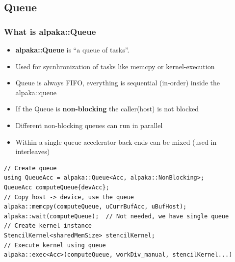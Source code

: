 \documentclass[9pt]{beamer}
\begin{document}
\subsection{Queue}

\begin{frame} [fragile]
\frametitle{What is alpaka::Queue}
\begin{itemize}
 \item \textbf{alpaka::Queue} is “a queue of tasks”.
 \item Used for sycnhronization of tasks like memcpy or kernel-execution
 \item Queue is always FIFO, everything is sequential (in-order) inside the alpaka::queue
 \item If the Queue is \textbf{non-blocking} the caller(host) is not blocked
 \item Different non-blocking queues can run in parallel
 \item Within a single queue accelerator back-ends can be mixed (used in interleaves)
\end{itemize}
\lstset{basicstyle=\ttfamily\scriptsize}
\begin{lstlisting}
// Create queue
using QueueAcc = alpaka::Queue<Acc, alpaka::NonBlocking>;
QueueAcc computeQueue{devAcc};
// Copy host -> device, use the queue
alpaka::memcpy(computeQueue, uCurrBufAcc, uBufHost);
alpaka::wait(computeQueue);  // Not needed, we have single queue
// Create kernel instance
StencilKernel<sharedMemSize> stencilKernel;
// Execute kernel using queue
alpaka::exec<Acc>(computeQueue, workDiv_manual, stencilKernel...)
\end{lstlisting}
\end{frame}
\end{document}
